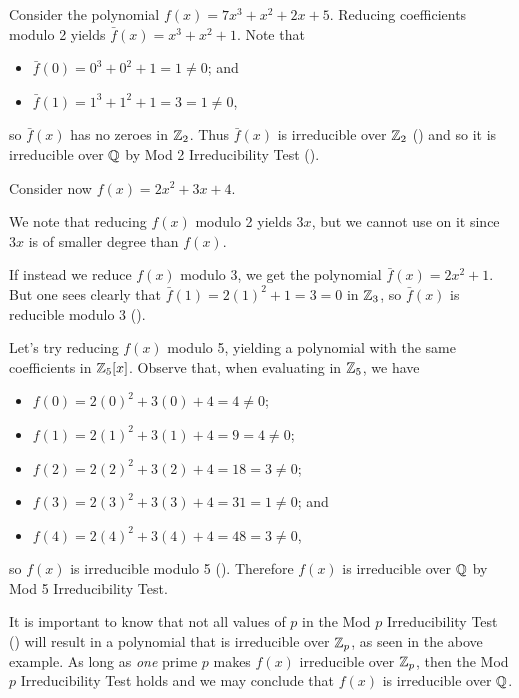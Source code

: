 \begin{example}
    Consider the polynomial $f(x) = 7x^3 + x^2 + 2x + 5$. Reducing coefficients modulo 2 yields $\bar{f}(x) = x^3 + x^2 + 1$. Note that
    \begin{itemize}
        \item $\bar{f}(0) = 0^3 + 0^2 + 1 = 1 \neq 0$; and
        \item $\bar{f}(1) = 1^3 + 1^2 + 1 = 3 = 1 \neq 0$,
    \end{itemize}
    so $\bar{f}(x)$ has no zeroes in $\mathbb{Z}_2$. Thus $\bar{f}(x)$ is irreducible over $\mathbb{Z}_2$ () and so it is irreducible over $\mathbb{Q}$ by Mod 2 Irreducibility Test ().
\end{example}
\begin{example}
    Consider now $f(x) = 2x^2 + 3x + 4$.
    
    We note that reducing $f(x)$ modulo 2 yields $3x$, but we cannot use  on it since $3x$ is of smaller degree than $f(x)$.

    If instead we reduce $f(x)$ modulo 3, we get the polynomial $\bar{f}(x) = 2x^2 + 1$. But one sees clearly that $\bar{f}(1) = 2(1)^2 + 1 = 3 = 0$ in $\mathbb{Z}_3$, so $\bar{f}(x)$ is reducible modulo 3 ().

    Let's try reducing $f(x)$ modulo 5, yielding a polynomial with the same coefficients in $\mathbb{Z}_5[x]$. Observe that, when evaluating in $\mathbb{Z}_5$, we have
    \begin{itemize}
        \item $f(0) = 2(0)^2 + 3(0) + 4 = 4 \neq 0$;
        \item $f(1) = 2(1)^2 + 3(1) + 4 = 9 = 4 \neq 0$;
        \item $f(2) = 2(2)^2 + 3(2) + 4 = 18 = 3 \neq 0$;
        \item $f(3) = 2(3)^2 + 3(3) + 4 = 31 = 1 \neq 0$; and
        \item $f(4) = 2(4)^2 + 3(4) + 4 = 48 = 3 \neq 0$,
    \end{itemize}
    so $f(x)$ is irreducible modulo 5 (). Therefore $f(x)$ is irreducible over $\mathbb{Q}$ by Mod 5 Irreducibility Test.
\end{example}

It is important to know that not all values of $p$ in the Mod $p$ Irreducibility Test () will result in a polynomial that is irreducible over $\mathbb{Z}_p$, as seen in the above example. As long as \textit{one} prime $p$ makes $f(x)$ irreducible over $\mathbb{Z}_p$, then the Mod $p$ Irreducibility Test holds and we may conclude that $f(x)$ is irreducible over $\mathbb{Q}$.

